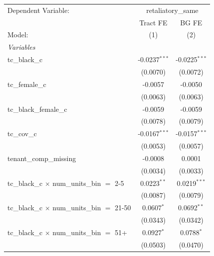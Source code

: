 \begingroup
\centering
\begin{tabular}{lcc}
   \tabularnewline \midrule \midrule
   Dependent Variable: & \multicolumn{2}{c}{retaliatory\_same}\\
                                                         & Tract FE        & BG FE \\   
   Model:                                                & (1)             & (2)\\  
   \midrule
   \emph{Variables}\\
   tc\_black\_c                                          & -0.0237$^{***}$ & -0.0225$^{***}$\\   
                                                         & (0.0070)        & (0.0072)\\   
   tc\_female\_c                                         & -0.0057         & -0.0050\\   
                                                         & (0.0063)        & (0.0063)\\   
   tc\_black\_female\_c                                  & -0.0059         & -0.0059\\   
                                                         & (0.0078)        & (0.0079)\\   
   tc\_cov\_c                                            & -0.0167$^{***}$ & -0.0157$^{***}$\\   
                                                         & (0.0053)        & (0.0057)\\   
   tenant\_comp\_missing                                 & -0.0008         & 0.0001\\   
                                                         & (0.0034)        & (0.0033)\\   
   tc\_black\_c $\times$ num\_units\_bin $=$ 2-5         & 0.0223$^{**}$   & 0.0219$^{***}$\\   
                                                         & (0.0087)        & (0.0079)\\   
   tc\_black\_c $\times$ num\_units\_bin $=$ 21-50       & 0.0607$^{*}$    & 0.0692$^{**}$\\   
                                                         & (0.0343)        & (0.0342)\\   
   tc\_black\_c $\times$ num\_units\_bin $=$ 51+         & 0.0927$^{*}$    & 0.0788$^{*}$\\   
                                                         & (0.0503)        & (0.0470)\\   

\end{tabular}
